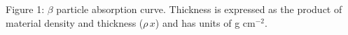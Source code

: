 Figure 1: $\beta$ particle absorption curve. Thickness is expressed as the product of material density and thickness ($\rho\,x$) and has units of g cm$^{-2}$.